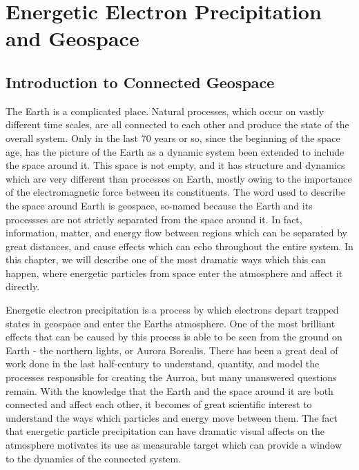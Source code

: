 \chapter{Energetic Electron Precipitation and Geospace}

\section{Introduction to Connected Geospace}

The Earth is a complicated place. Natural processes, which occur on vastly different time scales, are all connected to each other and produce the state of the overall system. Only in the last 70 years or so, since the beginning of the space age, has the picture of the Earth as a dynamic system been extended to include the space around it. This space is not empty, and it has structure and dynamics which are very different than processes on Earth, mostly owing to the importance of the electromagnetic force between its constituents. The word used to describe the space around Earth is geospace, so-named because the Earth and its processses are not strictly separated from the space around it. In fact, information, matter, and energy flow between regions which can be separated by great distances, and cause effects which can echo throughout the entire system. In this chapter, we will describe one of the most dramatic ways which this can happen, where energetic particles from space enter the atmosphere and affect it directly. 

Energetic electron precipitation is a process by which electrons depart trapped states in geospace and enter the Earths atmosphere. One of the most brilliant effects that can be caused by this process is able to be seen from the ground on Earth - the northern lights, or Aurora Borealis. There has been a great deal of work done in the last half-century to understand, quantity, and model the processes responsible for creating the Aurroa, but many unanswered questions remain. With the knowledge that the Earth and the space around it are both connected and affect each other, it becomes of great scientific interest to understand the ways which particles and energy move between them. The fact that energetic particle precipitation can have dramatic visual affects on the atmosphere motivates its use as measurable target which can provide a window to the dynamics of the connected system. 

